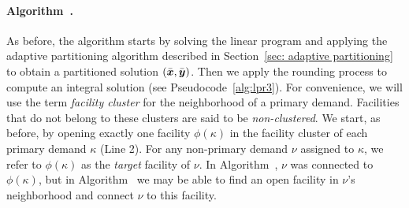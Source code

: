 \documentclass[11pt]{article}
\begin{document}
\paragraph{Algorithm~{\ECHS}.}
As before,
the algorithm starts by solving the linear program and applying the
adaptive partitioning algorithm  described in 
Section~\ref{sec: adaptive partitioning} to obtain a partitioned
solution $(\bar{\boldsymbol{x}}, \bar{\boldsymbol{y}})$. Then we apply the rounding
process to compute an integral solution (see Pseudocode~\ref{alg:lpr3}).  
For convenience, we will use
the term \emph{facility cluster} for the neighborhood of a
primary demand. Facilities that do not belong to these
clusters are said to be \emph{non-clustered}.  We start, as before, by
opening exactly one facility $\phi(\kappa)$ in the facility
cluster of each primary demand $\kappa$ (Line 2).  For any
non-primary demand $\nu$ assigned to $\kappa$, we refer to
$\phi(\kappa)$ as the \emph{target} facility of $\nu$.  In
Algorithm~{\EGUP}, $\nu$ was connected to $\phi(\kappa)$,
but in Algorithm~{\ECHS} we may be able to find an open
facility in $\nu$'s neighborhood and connect $\nu$ to this
facility. 


\end{document}
